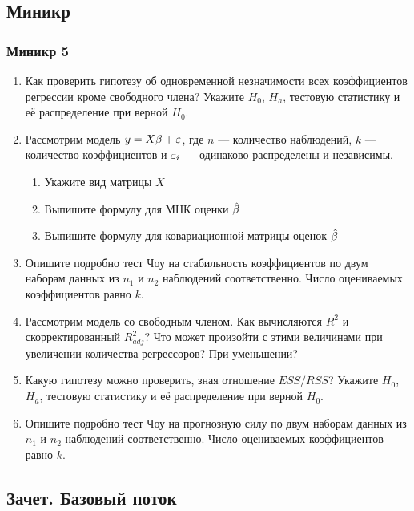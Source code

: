 \documentclass[12pt, a4paper]{article}
\begin{document}
\begin{enumerate}
\end{enumerate}

\subsection{Миникр}

\subsubsection*{Миникр 5}

\begin{enumerate}
\item Как проверить гипотезу об одновременной незначимости всех коэффициентов регрессии кроме свободного члена? Укажите $H_0$, $H_a$, тестовую статистику и её распределение при верной $H_0$.
\item Рассмотрим модель $y=X\beta + \varepsilon$, где $n$ — количество наблюдений, $k$ — количество коэффициентов и $\varepsilon_i$ — одинаково распределены и независимы.
\begin{enumerate}
\item Укажите вид матрицы $X$
\item Выпишите формулу для МНК оценки $\hat{\beta}$
\item Выпишите формулу для ковариационной матрицы оценок $\hat{\beta}$
\end{enumerate}
\item Опишите подробно тест Чоу на стабильность коэффициентов по двум наборам данных из $n_1$ и $n_2$ наблюдений соответственно. Число оцениваемых коэффициентов равно $k$.
\item Рассмотрим модель со свободным членом. Как вычисляются $R^2$ и скорректированный $R^2_{adj}$? Что может произойти с этими величинами при увеличении количества регрессоров? При уменьшении?
\item Какую гипотезу можно проверить, зная отношение $ESS/RSS$? Укажите $H_0$, $H_a$, тестовую статистику и её распределение при верной $H_0$.
\item Опишите подробно тест Чоу на прогнозную силу по двум наборам данных из $n_1$ и $n_2$ наблюдений соответственно. Число оцениваемых коэффициентов равно $k$.
\end{enumerate}


\subsection{Зачет. Базовый поток}
\end{document}
